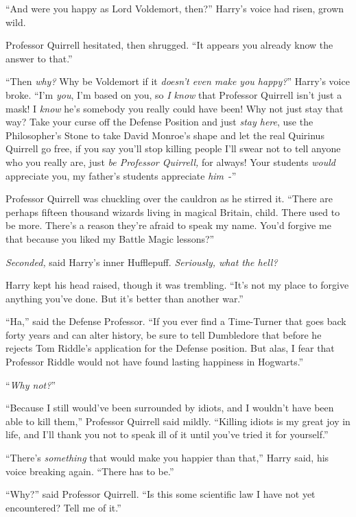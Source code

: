 ``And were you happy as Lord Voldemort, then?'' Harry's voice had risen, grown wild.

Professor Quirrell hesitated, then shrugged. ``It appears you already know the answer to that.''

``Then \emph{why?} Why be Voldemort if it \emph{doesn't even make you happy?}'' Harry's voice broke. ``I'm \emph{you}, I'm based on you, so \emph{I know} that Professor Quirrell isn't just a mask! I \emph{know} he's somebody you really could have been! Why not just stay that way? Take your curse off the Defense Position and just \emph{stay here}, use the Philosopher's Stone to take David Monroe's shape and let the real Quirinus Quirrell go free, if you say you'll stop killing people I'll swear not to tell anyone who you really are, just \emph{be Professor Quirrell,} for always! Your students \emph{would} appreciate you, my father's students appreciate \emph{him}~-''

Professor Quirrell was chuckling over the cauldron as he stirred it. ``There are perhaps fifteen thousand wizards living in magical Britain, child. There used to be more. There's a reason they're afraid to speak my name. You'd forgive me that because you liked my Battle Magic lessons?''

\emph{Seconded,} said Harry's inner Hufflepuff. \emph{Seriously, what the hell?}

Harry kept his head raised, though it was trembling. ``It's not my place to forgive anything you've done. But it's better than another war.''

``Ha,'' said the Defense Professor. ``If you ever find a Time-Turner that goes back forty years and can alter history, be sure to tell Dumbledore that before he rejects Tom Riddle's application for the Defense position. But alas, I fear that Professor Riddle would not have found lasting happiness in Hogwarts.''

``\emph{Why not?}''

``Because I still would've been surrounded by idiots, and I wouldn't have been able to kill them,'' Professor Quirrell said mildly. ``Killing idiots is my great joy in life, and I'll thank you not to speak ill of it until you've tried it for yourself.''

``There's \emph{something} that would make you happier than that,'' Harry said, his voice breaking again. ``There has to be.''

``Why?'' said Professor Quirrell. ``Is this some scientific law I have not yet encountered? Tell me of it.''

